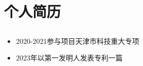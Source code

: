 
\chapter*{个人简历}




%




 \section*{}
 \begin{itemize}
 	\item 2020-2021参与项目天津市科技重大专项
 	\item 2023年以第一发明人发表专利一篇
 \end{itemize}
